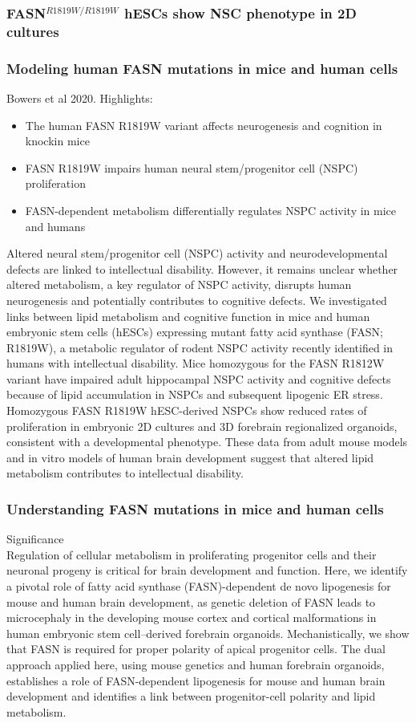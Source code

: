 \begin{itemize}
\begin{itemize}
\subsubsection{FASN$^{R1819W/R1819W}$ hESCs show NSC phenotype in 2D cultures}
\subsubsection{Modeling human FASN mutations in mice and human cells}
Bowers et al 2020. 
Highlights:
\begin{itemize}
    \item The human FASN R1819W variant affects neurogenesis and cognition in knockin mice
\item FASN R1819W impairs human neural stem/progenitor cell (NSPC) proliferation
\item FASN-dependent metabolism differentially regulates NSPC activity in mice and humans
\end{itemize}
Altered neural stem/progenitor cell (NSPC) activity and neurodevelopmental defects are linked to intellectual disability. However, it remains unclear whether altered metabolism, a key regulator of NSPC activity, disrupts human neurogenesis and potentially contributes to cognitive defects. We investigated links between lipid metabolism and cognitive function in mice and human embryonic stem cells (hESCs) expressing mutant fatty acid synthase (FASN; R1819W), a metabolic regulator of rodent NSPC activity recently identified in humans with intellectual disability. Mice homozygous for the FASN R1812W variant have impaired adult hippocampal NSPC activity and cognitive defects because of lipid accumulation in NSPCs and subsequent lipogenic ER stress. Homozygous FASN R1819W hESC-derived NSPCs show reduced rates of proliferation in embryonic 2D cultures and 3D forebrain regionalized organoids, consistent with a developmental phenotype. These data from adult mouse models and in vitro models of human brain development suggest that altered lipid metabolism contributes to intellectual disability.
\subsubsection{Understanding FASN mutations in mice and human cells}
Significance
\\Regulation of cellular metabolism in proliferating progenitor cells and their neuronal progeny is critical for brain development and function. Here, we identify a pivotal role of fatty acid synthase (FASN)-dependent de novo lipogenesis for mouse and human brain development, as genetic deletion of FASN leads to microcephaly in the developing mouse cortex and cortical malformations in human embryonic stem cell–derived forebrain organoids. Mechanistically, we show that FASN is required for proper polarity of apical progenitor cells. The dual approach applied here, using mouse genetics and human forebrain organoids, establishes a role of FASN-dependent lipogenesis for mouse and human brain development and identifies a link between progenitor-cell polarity and lipid metabolism.


\end{itemize}
\end{itemize}
